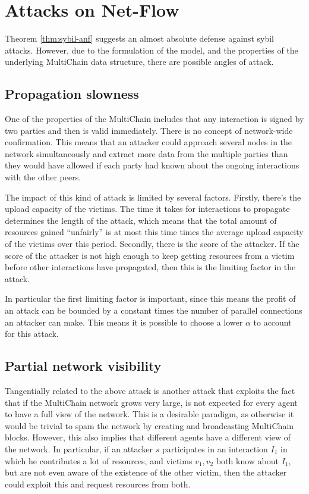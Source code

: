 \documentclass[a4paper,11pt]{book}
\theoremstyle{definition}
\begin{document}
\section{Attacks on Net-Flow}

Theorem \ref{thm:sybil-anf} suggests an almost absolute defense against sybil attacks. However,
due to the formulation of the model, and the properties of the underlying MultiChain data structure,
there are possible angles of attack.

\subsection{Propagation slowness}

One of the properties of the MultiChain includes that any interaction is signed by two parties and
then is valid immediately. There is no concept of network-wide confirmation. This means that an attacker
could approach several nodes in the network simultaneously and extract more data from the multiple parties
than they would have allowed if each party had known about the ongoing interactions with the other peers.

The impact of this kind of attack is limited by several factors. Firstly, there's the upload capacity of the
victims. The time it takes for interactions to propagate determines the length of the attack, which means that
the total amount of resources gained ``unfairly'' is at most this time times the average upload capacity of
the victims over this period. Secondly, there is the score of the attacker. If the score of the attacker is
not high enough to keep getting resources from a victim before other interactions have propagated, then this
is the limiting factor in the attack. 

In particular the first limiting factor is important, since this means the profit of an attack can be bounded
by a constant times the number of parallel connections an attacker can make. This means it is possible
to choose a lower $\alpha$ to account for this attack. 

\subsection{Partial network visibility}

Tangentially related to the above attack is another attack that exploits the fact that if the MultiChain
network grows very large, is not expected for every agent to have a full view of the network. This
is a desirable paradigm, as otherwise it would be trivial to spam the network by creating and broadcasting
MultiChain blocks. However, this also implies that different agents have a different view of the network.
In particular, if an attacker $s$ participates in an interaction $I_1$ in which he contributes a lot
of resources, and victims $v_1, v_2$ both know about $I_1$, but are not even aware of the existence of
the other victim, then the attacker could exploit this and request resources from both. 
\end{document}
